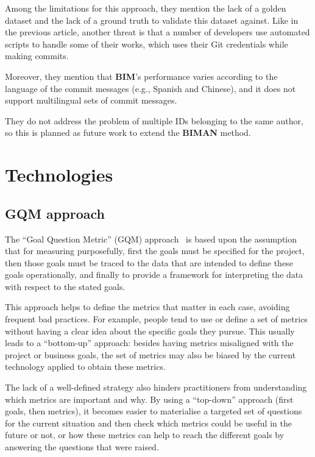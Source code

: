 \documentclass[a4paper, 12pt]{book}
\begin{document}
Among the limitations for this approach, they mention the lack of a golden dataset and the lack of a ground truth to validate this dataset against. Like in the previous article, another threat is that a number of developers use automated scripts to handle some of their works, which uses their Git credentials while making commits.

Moreover, they mention that \textbf{BIM}’s performance varies according to the language of the commit messages (e.g., Spanish and Chinese), and it does not support multilingual sets of commit messages.

They do not address the problem of multiple IDs belonging to the same author, so this is planned as future work to extend the \textbf{BIMAN} method.

\section{Technologies}
\label{sec:Technologies}

\subsection{GQM approach}
\label{ssec:gqm-approach}

The ``Goal Question Metric'' (GQM) approach~\cite{Basili94-gqm} is based upon the assumption that for measuring purposefully, first the goals must be specified for the project, then those goals must be traced to the data that are intended to define these goals operationally, and finally to provide a framework for interpreting the data with respect to the stated goals.

This approach helps to define the metrics that matter in each case, avoiding frequent bad practices. For example, people tend to use or define a set of metrics without having a clear idea about the specific goals they pursue. This usually leads to a ``bottom-up'' approach: besides having metrics misaligned with the project or business goals, the set of metrics may also be biased by the current technology applied to obtain these metrics.

The lack of a well-defined strategy also hinders practitioners from understanding which metrics are important and why. By using a ``top-down'' approach (first goals, then metrics), it becomes easier to materialise a targeted set of questions for the current situation and then check which metrics could be useful in the future or not, or how these metrics can help to reach the different goals by answering the questions that were raised.
\end{document}
